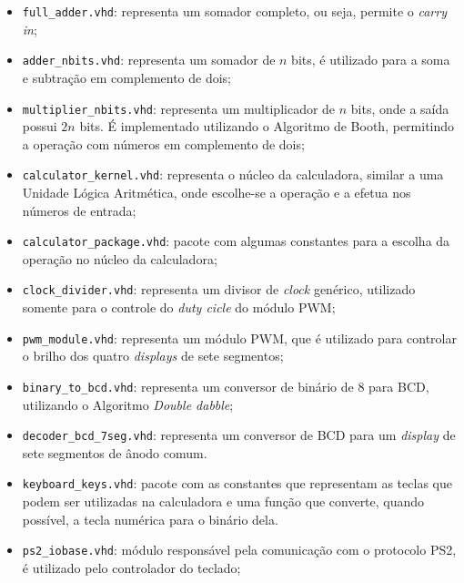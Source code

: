 \documentclass[a4paper, 12pt]{article}
\begin{document}
  \begin{itemize}
    \item
    \texttt{full\_adder.vhd}: representa um somador completo, ou seja,
    permite o \emph{carry in};

    \item
    \texttt{adder\_nbits.vhd}: representa um somador de $n$ bits, é 
    utilizado para a soma e subtração em complemento de dois;

    \item
    \texttt{multiplier\_nbits.vhd}: representa um multiplicador de
    $n$ bits, onde a saída possui $2n$ bits. É implementado utilizando
    o Algoritmo de Booth, permitindo a operação com números em complemento
    de dois;

    \item
    \texttt{calculator\_kernel.vhd}: representa o núcleo da calculadora,
    similar a uma Unidade Lógica Aritmética, onde escolhe-se
    a operação e a efetua nos números de entrada;

    \item
    \texttt{calculator\_package.vhd}: pacote com algumas constantes
    para a escolha da operação no núcleo da calculadora;

    \item
    \texttt{clock\_divider.vhd}: representa um divisor de \emph{clock}
    genérico, utilizado somente para o controle do \emph{duty cicle}
    do módulo PWM;

    \item
    \texttt{pwm\_module.vhd}: representa um módulo PWM, que é utilizado
    para controlar o brilho dos quatro \emph{displays} de sete segmentos;

    \item
    \texttt{binary\_to\_bcd.vhd}: representa um conversor de binário de
    \SI{8}{\bits} para BCD, utilizando o Algoritmo \emph{Double dabble};

    \item
    \texttt{decoder\_bcd\_7seg.vhd}: representa um conversor de BCD
    para um \emph{display} de sete segmentos de ânodo comum.

    \item
    \texttt{keyboard\_keys.vhd}: pacote com as constantes que representam
    as teclas que podem ser utilizadas na calculadora e uma função
    que converte, quando possível, a tecla numérica para o binário dela.

    \item
    \texttt{ps2\_iobase.vhd}: módulo responsável pela comunicação
    com o protocolo PS2, é utilizado pelo controlador do teclado;


\end{itemize}
\end{document}
